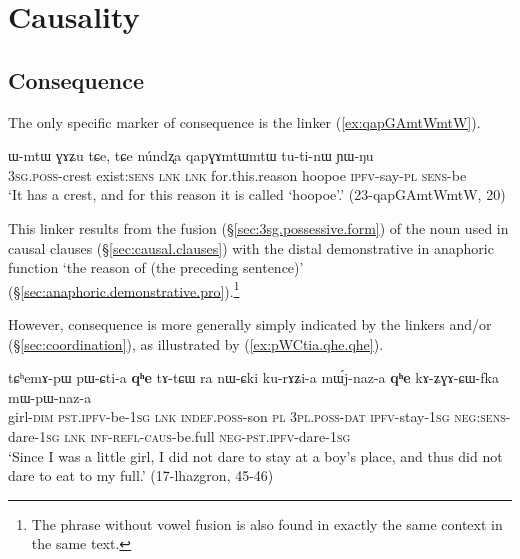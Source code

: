  

 \section{Causality} \label{sec:causality}

 \subsection{Consequence} \label{sec:consequence}
 The only specific marker of consequence is the linker  (\ref{ex:qapGAmtWmtW}).

\begin{exe}
\ex \label{ex:qapGAmtWmtW}
\gll ɯ-mtɯ ɣɤʑu tɕe, tɕe núndʐa qapɣɤmtɯmtɯ tu-ti-nɯ ɲɯ-ŋu \\
\textsc{3sg}.\textsc{poss}-crest exist:\textsc{sens} \textsc{lnk} \textsc{lnk} for.this.reason hoopoe \textsc{ipfv}-say-\textsc{pl} \textsc{sens}-be \\
\glt `It has a crest, and for this reason it is called `hoopoe'.' (23-qapGAmtWmtW, 20)
\end{exe}

This linker results from the fusion (§\ref{sec:3sg.possessive.form}) of the noun  used in causal clauses (§\ref{sec:causal.clauses}) with the distal demonstrative  in anaphoric function `the reason of (the preceding sentence)' (§\ref{sec:anaphoric.demonstrative.pro}).\footnote{The phrase  without vowel fusion is also found in exactly the same context in the same text. }

However, consequence is more generally simply indicated by the linkers  and/or  (§\ref{sec:coordination}), as illustrated by (\ref{ex:pWCtia.qhe.qhe}).

\begin{exe}
\ex \label{ex:pWCtia.qhe.qhe}
\gll tɕʰemɤ-pɯ pɯ-ɕti-a \textbf{qʰe} tɤ-tɕɯ ra nɯ-ɕki ku-rɤʑi-a mɯ́j-naz-a \textbf{qʰe} kɤ-ʑɣɤ-ɕɯ-fka mɯ-pɯ-naz-a \\
girl-\textsc{dim} \textsc{pst}.\textsc{ipfv}-be-\textsc{1sg} \textsc{lnk} \textsc{indef}.\textsc{poss}-son \textsc{pl} \textsc{3pl}.\textsc{poss}-\textsc{dat} \textsc{ipfv}-stay-\textsc{1sg} \textsc{neg}:\textsc{sens}-dare-\textsc{1sg} \textsc{lnk} \textsc{inf}-\textsc{refl}-\textsc{caus}-be.full \textsc{neg}-\textsc{pst}.\textsc{ipfv}-dare-\textsc{1sg} \\
\glt `Since I was a little girl, I did not dare to stay at a boy's place, and thus did not dare to eat to my full.' (17-lhazgron, 45-46)
\end{exe}
 
